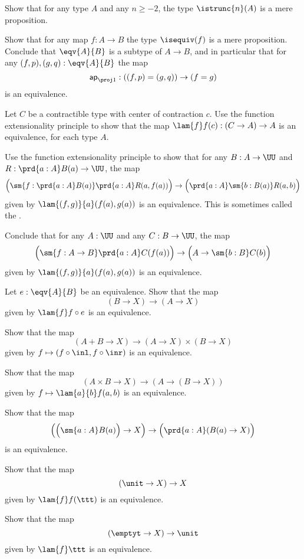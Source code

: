 \begin{exercises}
\item Show that for any type $A$ and any $n\geq-2$, the type $\istrunc{n}(A)$ is a mere proposition.
\item Show that for any map $f:A\to B$ the type $\isequiv(f)$ is a mere proposition. Conclude that $\eqv{A}{B}$ is a subtype of $A\to B$, and in particular that for any $(f,p),(g,q):\eqv{A}{B}$ the map
\begin{equation*}
\mathsf{ap}_{\proj 1} : ((f,p)= (g,q))\to (f=g)
\end{equation*}
is an equivalence.
\item Let $C$ be a contractible type with center of contraction $c$. Use the function extensionality principle to show that the map $\lam{f}f(c):(C\to A)\to A$ is an equivalence, for each type $A$.
\item Use the function extensionality principle to show that for any $B:A\to\UU$ and $R:\prd{a:A}B(a)\to \UU$, the map
\begin{equation*}
\Big(\sm{f:\prd{a:A}B(a)}\prd{a:A}R(a,f(a))\Big)\to \Big(\prd{a:A}\sm{b:B(a)}R(a,b)\Big)
\end{equation*}
given by $\lam{(f,g)}{a}(f(a),g(a))$ is an equivalence. This is sometimes called the .

Conclude that for any $A:\UU$ and any $C:B\to \UU$, the map
\begin{equation*}
\Big(\sm{f:A\to B} \prd{a:A}C(f(a))\Big)\to\Big(A\to\sm{b:B}C(b)\Big)
\end{equation*}
given by $\lam{(f,g)}{a}(f(a),g(a))$ is an equivalence.
\item Let $e:\eqv{A}{B}$ be an equivalence. Show that the map
\begin{equation*}
(B\to X)\to (A\to X)
\end{equation*}
given by $\lam{f}f\circ e$ is an equivalence.
\item Show that the map
\begin{equation*}
(A+B\to X)\to (A\to X)\times (B\to X)
\end{equation*}
given by $f\mapsto (f\circ\inl,f\circ\inr)$ is an equivalence.
\item Show that the map
\begin{equation*}
(A\times B\to X)\to (A\to (B\to X))
\end{equation*}
given by $f\mapsto \lam{a}{b}f(a,b)$ is an equivalence.
\item Show that the map
\begin{equation*}
\Big(\Big(\sm{a:A}B(a)\Big)\to X\Big)\to \Big(\prd{a:A}(B(a)\to X)\Big)
\end{equation*}
is an equivalence.
\item Show that the map
\begin{equation*}
(\unit\to X)\to X
\end{equation*}
given by $\lam{f}f(\ttt)$ is an equivalence. 
\item Show that the map
\begin{equation*}
(\emptyt \to X)\to \unit
\end{equation*}
given by $\lam{f}\ttt$ is an equivalence.
\end{exercises}
